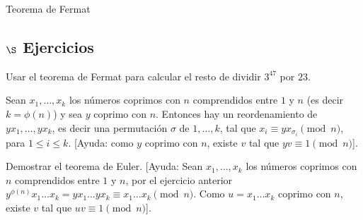 \begin{section}{Teorema de Fermat}
\subsection*{$\S$ Ejercicios}

\begin{enumex}
\item Usar el teorema de Fermat para calcular el resto de dividir
$3^{47}$ por $23$.

\item \label{demdeeuler-1} Sean $x_1,\ldots,x_k$ los números coprimos con $n$ comprendidos
entre $1$ y $n$ (es decir $k=\phi(n)$) y sea $y$ coprimo con $n$.
Entonces hay un reordenamiento de $yx_1,\ldots,yx_k$, es decir una
permutación $\sigma$ de $1,\ldots,k$, tal que $x_i \equiv
yx_{\sigma_i} \pmod{n}$, para $1\le i \le k$. [Ayuda: como $y$
coprimo con $n$, existe $v$ tal que $yv\equiv 1\pmod{n}$].

\item \label{demdeeuler-2}Demostrar el teorema de Euler. [Ayuda: Sean $x_1,\ldots,x_k$ los
números coprimos con $n$ comprendidos entre $1$ y $n$, por el
ejercicio anterior $y^{\phi(n)}x_1\ldots x_k =yx_1\ldots yx_k
\equiv x_1\ldots x_k \pmod{n}$. Como $u=x_1\ldots x_k$ coprimo con
$n$, existe $v$ tal que $uv\equiv 1\pmod{n}$].
\end{enumex}

\end{section}


